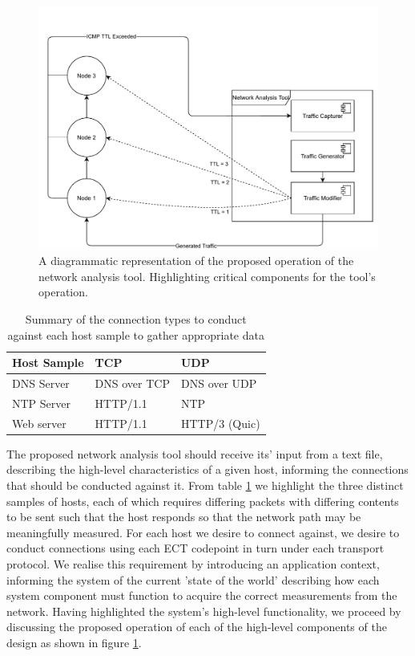 \documentclass{l4proj}
\begin{document}
\begin{figure}[H]
\centering
\includegraphics[width=14cm]{dissertation/images/sys_arch.pdf}
\caption{A diagrammatic representation of the proposed operation of the network analysis tool. Highlighting critical components for the tool's operation.}
\label{fig:tooldesign}
\end{figure}

\begin{table}[]
\centering
\begin{tabular}{|l|l|l|}
\hline
\textbf{Host Sample} & \textbf{TCP}          & \textbf{UDP}           \\ \hline
DNS Server  & DNS over TCP & DNS over UDP  \\ \hline
NTP Server  & HTTP/1.1     & NTP           \\ \hline
Web server  & HTTP/1.1     & HTTP/3 (Quic) \\ \hline
\end{tabular}
\caption{Summary of the connection types to conduct against each host sample to gather appropriate data}
\label{table:proto}
\end{table}

The proposed network analysis tool should receive its' input from a text file, describing the high-level characteristics of a given host, informing the connections that should be conducted against it. From table \ref{table:proto} we highlight the three distinct samples of hosts, each of which requires differing packets with differing contents to be sent such that the host responds so that the network path may be meaningfully measured. For each host we desire to connect against, we desire to conduct connections using each ECT codepoint in turn under each transport protocol. We realise this requirement by introducing an application context, informing the system of the current 'state of the world' describing how each system component must function to acquire the correct measurements from the network. Having highlighted the system's high-level functionality, we proceed by discussing the proposed operation of each of the high-level components of the design as shown in figure \ref{fig:tooldesign}.
\end{document}
